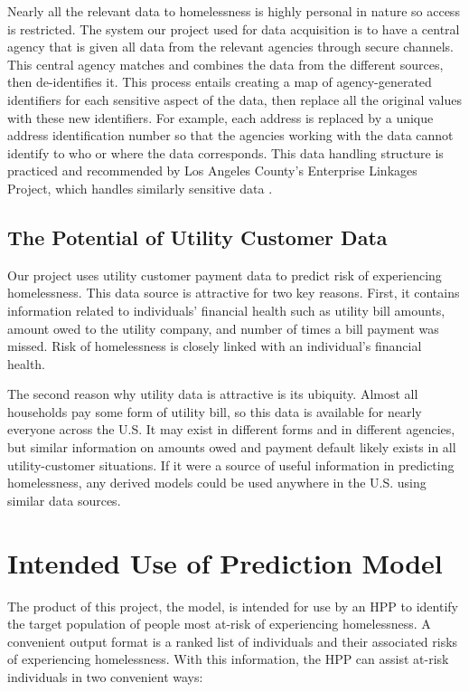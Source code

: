 \documentclass[utf8]{frontiersFPHY} %
\begin{document}
Nearly all the relevant data to homelessness is highly personal in nature so access is restricted. The system our project used for data acquisition is to have a central agency that is given all data from the relevant agencies through secure channels. This central agency matches and combines the data from the different sources, then de-identifies it. This process entails creating a map of agency-generated identifiers for each sensitive aspect of the data, then replace all the original values with these new identifiers. For example, each address is replaced by a unique address identification number so that the agencies working with the data cannot identify to who or where the data corresponds. This data handling structure is practiced and recommended by Los Angeles County’s Enterprise Linkages Project, which handles similarly sensitive data \cite{byrne2012angeles}.

\subsection*{The Potential of Utility Customer Data}
Our project uses utility customer payment data to predict risk of experiencing homelessness. This data source is attractive for two key reasons. First, it contains information related to individuals' financial health such as utility bill amounts, amount owed to the utility company, and number of times a bill payment was missed. Risk of homelessness is closely linked with an individual's financial health.

The second reason why utility data is attractive is its ubiquity. Almost all households pay some form of utility bill, so this data is available for nearly everyone across the U.S. It may exist in different forms and in different agencies, but similar information on amounts owed and payment default likely exists in all utility-customer situations. If it were a source of useful information in predicting homelessness, any derived models could be used anywhere in the U.S. using similar data sources. 

\section{Intended Use of Prediction Model}
The product of this project, the model, is intended for use by an HPP to identify the target population of people most at-risk of experiencing homelessness. A convenient output format is a ranked list of individuals and their associated risks of experiencing homelessness. With this information, the HPP can assist at-risk individuals in two convenient ways:
\end{document}
